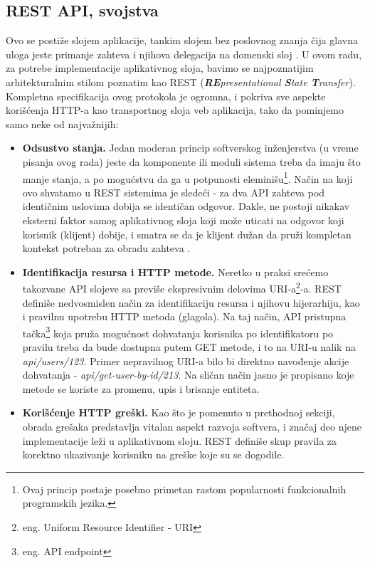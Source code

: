 \documentclass[12pt,oneside]{memoir}
\begin{document}
\subsection{REST API, svojstva}

Ovo se postiže slojem aplikacije, tankim slojem bez poslovnog znanja čija glavna uloga jeste primanje zahteva i njihova delegacija na domenski sloj \cite{dddfull}. U ovom radu, za potrebe implementacije aplikativnog sloja, bavimo se najpoznatijim arhitekturalnim stilom poznatim kao REST (\textit{\textbf{RE}presentational \textbf{S}tate \textbf{T}ransfer}). Kompletna specifikacija ovog protokola je ogromna, i pokriva sve aspekte korišćenja HTTP-a kao transportnog sloja veb aplikacija, tako da pominjemo samo neke od najvažnijih:

\begin{itemize}
    \item \textbf{Odsustvo stanja.} Jedan moderan princip softverskog inženjerstva (u vreme pisanja ovog rada) jeste da komponente ili moduli sistema treba da imaju što manje stanja, a po mogućstvu da ga u potpunosti eleminišu\footnote{Ovaj princip postaje posebno primetan rastom popularnosti funkcionalnih programskih jezika.}. Način na koji ovo shvatamo u REST sistemima je sledeći - za dva API zahteva pod identičnim uslovima dobija se identičan odgovor. Dakle, ne postoji nikakav eksterni faktor samog aplikativnog sloja koji može uticati na odgovor koji korisnik (klijent) dobije, i smatra se da je klijent dužan da pruži kompletan kontekst potreban za obradu zahteva \cite{restapi}.

    \item \textbf{Identifikacija resursa i HTTP metode.} Neretko u praksi srećemo takozvane API slojeve sa previše ekspresivnim delovima URI-a\footnote{eng. Uniform Resource Identifier - URI}-a. REST definiše nedvosmislen način za identifikaciju resursa i njihovu hijerarhiju, kao i pravilnu upotrebu HTTP metoda (glagola). Na taj način, API pristupna tačka\footnote{eng. API endpoint} koja pruža mogućnost dohvatanja korisnika po identifikatoru po pravilu treba da bude dostupna putem GET metode, i to na URI-u nalik na \textit{api/users/123}\cite{restapi}. Primer nepravilnog URI-a bilo bi direktno navođenje akcije dohvatanja - \textit{api/get-user-by-id/213}. Na sličan način jasno je propisano koje metode se koriste za promenu, upis i brisanje entiteta.

    \item \textbf{Korišćenje HTTP greški.} Kao što je pomenuto u prethodnoj sekciji, obrada grešaka predstavlja vitalan aspekt razvoja softvera, i značaj deo njene implementacije leži u aplikativnom sloju. REST definiše skup pravila za korektno ukazivanje korisniku na greške koje su se dogodile.  
\end{itemize}
\end{document}
